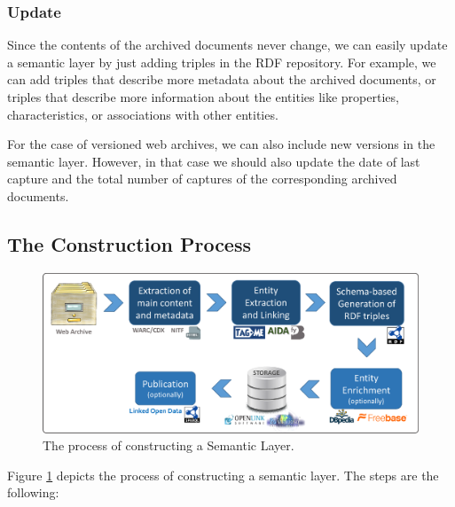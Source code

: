 \documentclass[twocolumn]{svjour3}
\begin{document}
\subsubsection*{Update}
Since the contents of the archived documents never change,
we can easily update a semantic layer by just
adding triples in the RDF repository.
For example, we can add triples that describe
more metadata about the archived documents,
or triples that describe more information about
the entities like properties, characteristics, or associations
with other entities.

For the case of versioned web archives,
we can also include new versions in the semantic layer.
However, in that case we should also
update the date of last capture
and the total number of captures of the corresponding
archived documents.


\subsection{The Construction Process}
\label{subsec:theprocess}

\begin{figure}
\centering
\includegraphics[width=6in]{figures/process.eps}
\caption{The process of constructing a Semantic Layer.}
\label{fig:process}
\end{figure}

Figure \ref{fig:process} depicts the
process of constructing a semantic layer.
The steps are the following:
\end{document}
